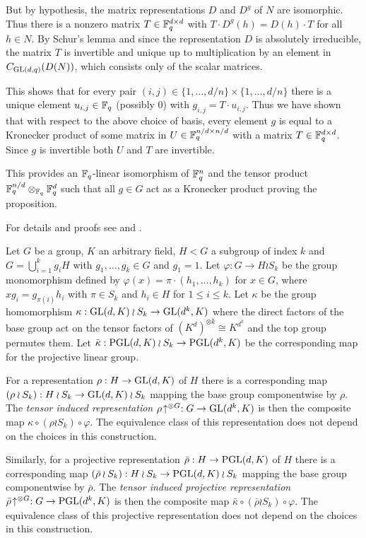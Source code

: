 But by hypothesis, the matrix representations $D$ and $D^g$ of $N$
are isomorphic. Thus there is a nonzero matrix $T \in \mathbb{F}_q^{d \times d}$ with
$T \cdot D^g(h) = D(h) \cdot T$ for all $h \in N$. By Schur's lemma and
since the representation $D$ is absolutely irreducible,
the matrix $T$ is invertible and unique 
up to multiplication by an element in $C_{\GL(d,q)}(D(N))$, which
consists only of the scalar matrices.

This shows that for every pair $(i,j) \in \{ 1, \ldots, d/n \} \times 
\{ 1, \ldots, d/n \}$ there
is a unique element $u_{i,j} \in \mathbb{F}_q$ (possibly $0$) with 
$g_{i,j} = T \cdot u_{i,j}$. Thus we have shown that with respect to
the above choice of basis, every element $g$ is equal to a Kronecker 
product of some matrix in $U \in \mathbb{F}_q^{n/d \times n/d}$ with a matrix
$T \in \mathbb{F}_q^{d \times d}$. Since $g$ is invertible both 
$U$ and $T$ are invertible. 

This provides an $\mathbb{F}_q$-linear isomorphism of 
$\mathbb{F}_q^n$ and the tensor product $\mathbb{F}_q^{n/d} \otimes_{\mathbb{F}_q} \mathbb{F}_q^d$
such that all $g \in G$ act as a Kronecker product proving the
proposition.
\proofend

\begin{DefProp}
    For details and proofs see \cite[13A]{CRI} and \cite[Section~2]{kovacs}.

    Let $G$ be a group, $K$ an arbitrary field, $H<G$ a subgroup of
    index $k$ and $G=\bigcup_{i=1}^k g_i H$ with $g_1,\ldots,g_k \in
    G$ and $g_1=1$. Let $\varphi : G \to H \wr S_k$ be the group
    monomorphism defined by $\varphi(x) = \pi \cdot (h_1,\ldots,h_k)$
    for $x \in G$, where $xg_i = g_{\pi(i)}h_i$ with $\pi \in S_k$
    and $h_i \in H$ for $1 \le i \le k$.
    Let $\kappa$ be the group homomorphism $\kappa: \GL(d,K)
    \wr S_k \to \GL(d^k,K)$ where the direct factors of the base group
    act on the tensor factors of $(K^d)^{\otimes k} \cong K^{d^k}$ and
    the top group permutes them. Let $\bar\kappa : \PGL(d,K) \wr S_k
    \to \PGL(d^k,K)$ be the corresponding map for the projective linear
    group.

    For a representation $\rho: H \to \GL(d,K)$ of $H$
    there is a corresponding map $(\rho \wr S_k) : H \wr S_k \to
    \GL(d,K) \wr S_k$ mapping the base group componentwise by $\rho$. 
    The \emph{tensor induced representation}
    $\rho\!\uparrow^{\otimes G} : G \to \GL(d^k,K)$ is then the
    composite map $\kappa \circ (\rho \wr S_k) \circ \varphi$. The
    equivalence class of this representation does not depend on the
    choices in this construction.

    Similarly,
    for a projective representation $\bar\rho : H \to \PGL(d,K)$ of
    $H$ there is a corresponding map 
    $(\bar\rho \wr S_k) : H \wr S_k \to \PGL(d,K) \wr S_k$ 
    mapping the base group
    componentwise by $\bar\rho$.
    The \emph{tensor induced projective representation}
    $\bar\rho\!\uparrow^{\otimes G} : G \to \PGL(d^k,K)$ is then the
    composite map $\bar\kappa \circ (\bar\rho \wr S_k) \circ \varphi$.
    The equivalence class of this projective representation does not
    depend on the choices in this construction.
\end{DefProp}


